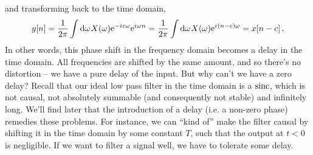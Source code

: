 %
and transforming back to the time domain,
%
\begin{displaymath}
  y[n] = \frac{1}{2\pi}\int\mathrm{d}\omega\mkern1muX(\omega)\mathrm{e}^{-{i\mkern1mu} c\omega}\mathrm{e}^{{i\mkern1mu}\omega n}
  = \frac{1}{2\pi}\int\mathrm{d}\omega\mkern1muX(\omega)\mathrm{e}^{{i\mkern1mu}(n - c)\omega} = x[n-c] \,.
\end{displaymath}
%
In other words, this phase shift in the frequency domain becomes a delay in
the time domain. All frequencies are shifted by the same amount, and
so there's no distortion -- we have a pure delay of the input. But why can't we
have a zero delay? Recall that our ideal low pass filter in the time domain is
a $\operatorname{sinc}$, which is not causal, not absolutely summable (and consequently
not stable) and infinitely long. We'll find later that the introduction of a
delay (i.e. a non-zero phase) remedies these problems. For instance, we can
``kind of'' make the filter causal by shifting it in the time domain by some
constant $T$, such that the output at $t < 0$  is negligible. If we want to filter
a signal well, we have to tolerate some delay.
